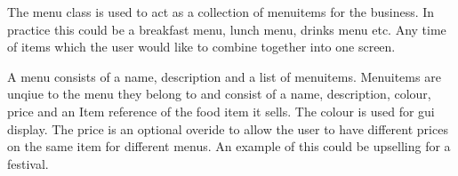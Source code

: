 	\begin{minipage}[t]{.6\linewidth}
		The menu class is used to act as a collection of menuitems for the business. In practice this could be a breakfast menu, lunch menu, drinks menu etc. Any time of items which the user would like to combine together into one screen.
		\linebreak
		
		A menu consists of a name, description and a list of menuitems. Menuitems are unqiue to the menu they belong to and consist of a name, description, colour, price and an Item reference of the food item it sells. The colour is used for gui display. The price is an optional overide to allow the user to have different prices on the same item for different menus. An example of this could be upselling for a festival.
		
	\end{minipage}
	\hspace{0.02\linewidth}
